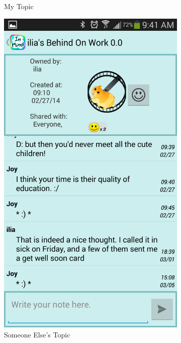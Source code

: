 \begin{figure}
\begin{subfigure}[b]{0.3\textwidth}
         \caption{My Topic}
      \end{subfigure}
      \begin{subfigure}[b]{0.3\textwidth}
        \includegraphics[width=\textwidth]{topic_view_other.png}
        \caption{Someone Else's Topic}
      \end{subfigure}
      \begin{subfigure}[b]{0.3\textwidth}

\end{subfigure}
\end{figure}
